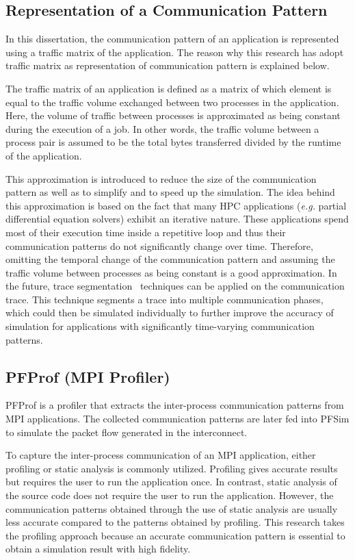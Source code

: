 \subsection{Representation of a Communication Pattern}

In this dissertation, the communication pattern of an application is
represented using a traffic matrix of the application. The reason why this
research has adopt traffic matrix as representation of communication pattern
is explained below.

The traffic matrix of an application is defined as a matrix of which element
is equal to the traffic volume exchanged between two processes in the
application. Here, the volume of traffic between processes is approximated as
being constant during the execution of a job. In other words, the traffic
volume between a process pair is assumed to be the total bytes transferred
divided by the runtime of the application.

This approximation is introduced to reduce the size of the communication
pattern as well as to simplify and to speed up the simulation. The idea behind
this approximation is based on the fact that many HPC applications
(\emph{e.g.} partial differential equation solvers) exhibit an iterative
nature. These applications spend most of their execution time inside a
repetitive loop and thus their communication patterns do not significantly
change over time. Therefore, omitting the temporal change of the communication
pattern and assuming the traffic volume between processes as being constant is
a good approximation. In the future, trace segmentation~\autocite{Alawneh2016}
techniques can be applied on the communication trace. This technique
segments a trace into multiple communication phases, which could then be
simulated individually to further improve the accuracy of simulation for
applications with significantly time-varying communication patterns.

\subsection{PFProf (MPI Profiler)}\label{sec:ii-pfprof}

PFProf is a profiler that extracts the inter-process communication patterns
from MPI applications. The collected communication patterns are later fed into
PFSim to simulate the packet flow generated in the interconnect.

To capture the inter-process communication of an MPI application, either
profiling or static analysis is commonly utilized. Profiling gives accurate
results but requires the user to run the application once. In contrast, static
analysis of the source code does not require the user to run the application.
However, the communication patterns obtained through the use of static
analysis are usually less accurate compared to the patterns obtained by
profiling. This research takes the profiling approach because an accurate
communication pattern is essential to obtain a simulation result with high
fidelity.

